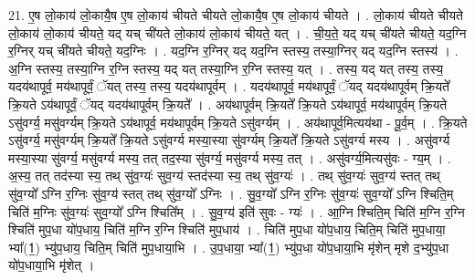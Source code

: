 \documentclass[17pt]{extarticle}
\begin{document}
21. ए॒ष लो॒काय॑ लो॒कायै॒ष ए॒ष लो॒काय॑ चीयते चीयते लो॒कायै॒ष ए॒ष लो॒काय॑ चीयते । . लो॒काय॑ चीयते चीयते लो॒काय॑ लो॒काय॑ चीयते॒ यद् यच् ची॑यते लो॒काय॑ लो॒काय॑ चीयते॒ यत् । . ची॒य॒ते॒ यद् यच् ची॑यते चीयते॒ यद॒ग्नि र॒ग्निर् यच् ची॑यते चीयते॒ यद॒ग्निः । . यद॒ग्नि र॒ग्निर् यद् यद॒ग्नि स्तस्य॒ तस्या॒ग्निर् यद् यद॒ग्नि स्तस्य॑ । . अ॒ग्नि स्तस्य॒ तस्या॒ग्नि र॒ग्नि स्तस्य॒ यद् यत् तस्या॒ग्नि र॒ग्नि स्तस्य॒ यत् । . तस्य॒ यद् यत् तस्य॒ तस्य॒ यदय॑थापूर्व॒ मय॑थापूर्वं॒ ॅयत् तस्य॒ तस्य॒ यदय॑थापूर्वम् । . यदय॑थापूर्व॒ मय॑थापूर्वं॒ ॅयद् यदय॑थापूर्वम् क्रि॒यते᳚ क्रि॒यते ऽय॑थापूर्वं॒ ॅयद् यदय॑थापूर्वम् क्रि॒यते᳚ । . अय॑थापूर्वम् क्रि॒यते᳚ क्रि॒यते ऽय॑थापूर्व॒ मय॑थापूर्वम् क्रि॒यते ऽसु॑वर्ग्य॒ मसु॑वर्ग्यम् क्रि॒यते ऽय॑थापूर्व॒ मय॑थापूर्वम् क्रि॒यते ऽसु॑वर्ग्यम् । . अय॑थापूर्व॒मित्यय॑था - पू॒र्व॒म् । . क्रि॒यते ऽसु॑वर्ग्य॒ मसु॑वर्ग्यम् क्रि॒यते᳚ क्रि॒यते ऽसु॑वर्ग्य मस्या॒स्या सु॑वर्ग्यम् क्रि॒यते᳚ क्रि॒यते ऽसु॑वर्ग्य मस्य । . असु॑वर्ग्य मस्या॒स्या सु॑वर्ग्य॒ मसु॑वर्ग्य मस्य॒ तत् तद॒स्या सु॑वर्ग्य॒ मसु॑वर्ग्य मस्य॒ तत् । . असु॑वर्ग्य॒मित्यसु॑वः - ग्य॒म् । . अ॒स्य॒ तत् तद॑स्या स्य॒ तथ् सु॑व॒ग्यः॑ सुव॒ग्य॑ स्तद॑स्या स्य॒ तथ् सु॑व॒ग्यः॑ । . तथ् सु॑व॒ग्यः॑ सुव॒ग्य॑ स्तत् तथ् सु॑व॒ग्यो᳚ ऽग्नि र॒ग्निः सु॑व॒ग्य॑ स्तत् तथ् सु॑व॒ग्यो᳚ ऽग्निः । . सु॒व॒ग्यो᳚ ऽग्नि र॒ग्निः सु॑व॒ग्यः॑ सुव॒ग्यो᳚ ऽग्नि श्चिति॒म् चिति॑ म॒ग्निः सु॑व॒ग्यः॑ सुव॒ग्यो᳚ ऽग्नि श्चिति᳚म् । . सु॒व॒ग्य॑ इति॑ सुवः - ग्यः॑ । . आ॒ग्नि श्चिति॒म् चिति॑ म॒ग्नि र॒ग्नि श्चिति॑ मुप॒धा यो॑प॒धाय॒ चिति॑ म॒ग्नि र॒ग्नि श्चिति॑ मुप॒धाय॑ । . चिति॑ मुप॒धा यो॑प॒धाय॒ चिति॒म् चिति॑ मुप॒धाया॒ भ्या᳚(1॒) भ्यु॑प॒धाय॒ चिति॒म् चिति॑ मुप॒धाया॒भि । . उ॒प॒धाया॒ भ्या᳚(1॒) भ्यु॑प॒धा यो॑प॒धाया॒भि मृ॑शेन् मृशे द॒भ्यु॑प॒धा यो॑प॒धाया॒भि मृ॑शेत् । \newline
\end{document}
